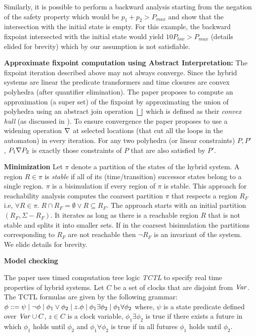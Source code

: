 Similarly, it is possible to perform a backward analysis starting from the negation of the safety property
which would be $p_1 + p_2 > P_{max}$ and show that the intersection with the initial state is empty.
For this example, the backward fixpoint intersected with the initial state would yield $10 P_{low} > P_{max}$
(details elided for brevity) which by our assumption is not satisfiable.

\textbf{Approximate fixpoint computation using Abstract Interpretation:}
The fixpoint iteration described above may not always converge. Since the hybrid  systems are linear
the predicate transformers and time closures are convex polyhedra (after quantifier elimination).
The paper proposes to compute an approximation (a super set) of the fixpoint by approximating the 
union of polyhedra  using an abstract join operation $\bigsqcup$ which is defined as their \emph{convex hull}
(as discussed in \cite{pcousot:78}).
To ensure convergence the paper proposes to use a widening operation $\nabla$ at selected locations (that cut
all the loops in the automaton) in every iteration. For any two polyhedra (or linear constraints) 
$P,P'$, $P_1 \nabla P_2$  is exactly those constraints of $P$ that are also satisfied by $P'$.

\textbf{Minimization}
Let $\pi$ denote a partition of the states of the hybrid system. A region $R \in \pi$ is \emph{stable} if all of its 
(time/transition) successor states belong to a single region. $\pi$ is a bisimulation if every region of $\pi$
is stable. This approach for reachability analysis computes the coarsest partition $\pi$ that respects
a region $R_F$ i.e, $\forall R \in \pi. \; R \cap R_F = \emptyset \vee R \subseteq R_F$. The approach starts 
with an initial partition $(R_F,\Sigma - R_F)$. It iterates as long as there is a reachable region $R$ that 
is not stable and splits it into smaller sets. If in the coarsest bisimulation the partitions corresponding 
to $R_F$ are not reachable then $\neg R_F$ is an invariant of the system. We elide details for brevity.

\textbf{Model checking}

The paper uses timed computation tree logic \emph{TCTL} to specify real time properties of hybrid systems.
Let $C$ be a set of clocks that are disjoint from $\mathit{Var}$. The TCTL formulas are given by the following grammar: 
$\phi ::= \psi \; | \; \neg \phi \; | \; \phi_1 \vee \phi_2 \; | \; z.\phi \; | \; \phi_1 \exists \phi_2 \; | \; \phi_1 \forall \phi_2$
where, $\psi$ is a state predicate defined over $\mathit{Var} \cup C$, $z \in C$ is a clock variable,
$\phi_1 \exists \phi_2$ is true if there exists a future in which $\phi_1$ holds until $\phi_2$ 
and $\phi_1 \forall \phi_2$ is true if in all futures $\phi_1$ holds until $\phi_2$.

